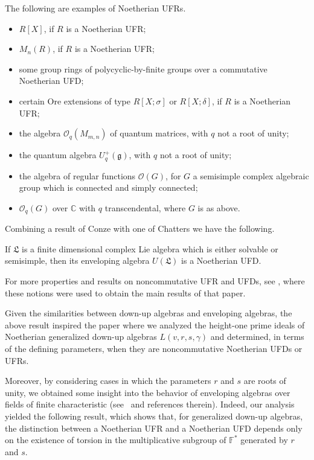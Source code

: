 \documentclass{commat}
\newcommand{\FF}{\mathbb{F}}
\begin{document}
\begin{example}
	The following are examples of  Noetherian UFRs.
	\begin{itemize}
		\item $R[X]$, if $R$ is a Noetherian UFR;
		\item $M_n(R)$, if $R$ is a Noetherian UFR;
		\item some group rings of  polycyclic-by-finite groups over a commutative Noetherian UFD;
		\item certain Ore extensions of type $R[X; \sigma]$ or $R[X; \delta]$, if $R$ is a Noetherian UFR;
		\item the algebra $\mathcal{O}_q(M_{m, n})$ of quantum matrices, with $q$ not a root of unity;
		\item the quantum algebra $U^+_q(\mathfrak{g})$, with $q$ not a root of unity;
		\item the algebra of regular functions $\mathcal{O}(G)$, for $G$ a semisimple complex algebraic group which is connected and simply connected;
		\item  $\mathcal{O}_q(G)$ over $\mathbb{C}$ with $q$ transcendental, where $G$ is as above.
	\end{itemize}
\end{example}

Combining a result of Conze \cite{nC74} with one of Chatters \cite{aC84} we have the following.

\begin{theorem}
	If $\mathfrak{L}$ is a finite dimensional complex Lie algebra which is either solvable or semisimple, then its enveloping algebra $U(\mathfrak{L})$ is a Noetherian UFD. 
\end{theorem}

For more properties and results on noncommutative UFR and UFDs, see \cite{GY16}, where these notions were used to obtain the main results of that paper.

Given the similarities between down-up algebras and enveloping algebras, the above result inspired the paper \cite{LL13} where we analyzed the height-one prime ideals of Noetherian generalized down-up algebras $L(v,r,s,\gamma)$ and determined, in terms of the defining parameters, when they are noncommutative Noetherian UFDs or UFRs. 

Moreover, by considering cases in which the parameters $r$ and $s$ are roots of unity, we obtained some insight into the behavior of enveloping algebras over fields of finite characteristic (see~\cite{aB07} and references therein). Indeed, our analysis yielded the following result, which shows that, for generalized down-up algebras, the distinction between a Noetherian UFR and a Noetherian UFD depends only on the existence of torsion in the multiplicative subgroup of $\FF^{*}$ generated by $r$ and $s$.
\end{document}
